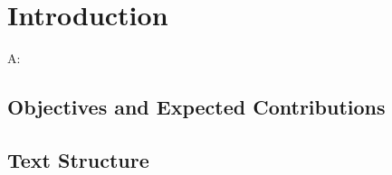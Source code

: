 \chapter{Introduction}
\label{chap:introduction}



A: \cite{bilmes1997optimizing}

\section{Objectives and Expected Contributions}
\label{sec:contributions}

\section{Text Structure}
\label{sec:org}
